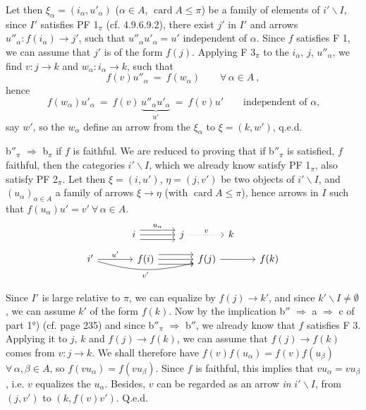 \documentclass[11pt]{article}
\newcommand{\printedpage}[1]{\marginpar{\footnotesize p.~#1}}
\newcommand{\msp}[1]{\marginpar{\footnotesize [#1]}}
\newcommand{\card}{\operatorname{card}}
\begin{document}
\msp{page 241}
Let then $\xi_\alpha = (i_\alpha, u'_\alpha)$ ($\alpha \in A$, $\card A \leqslant \pi$) be a family of elements of $i'\backslash I$, since $I'$ satisfies PF 1$_\pi$ (cf. 4.9.6.9.2), there exist $j'$ in $I'$ and arrows $u''_\alpha : f(i_\alpha) \longrightarrow j'$, such that $u''_\alpha u'_\alpha = u'$ independent of $\alpha$. Since $f$ satisfies F 1, we can assume that $j'$ is of the form $f(j)$. Applying F 3$_\pi$ to the $i_\alpha$, $j$, $u''_\alpha$, we find $v : j \longrightarrow k$ and $w_\alpha : i_\alpha \longrightarrow k$, such that
\[
f(v)u''_\alpha \ = \ f(w_\alpha) \qquad \forall\, \alpha \in A \ ,
\]
hence
\[
f(w_\alpha)u'_\alpha \ = \ f(v)\,\underbrace{u''_\alpha u'_\alpha}_{u'} \ = \ f(v)u' \qquad \text{independent of $\alpha$,}
\]
say $w'$, so the $w_\alpha$ define an arrow from the $\xi_\alpha$ to $\xi = (k, w')$, q.e.d.

b$''_\pi$ $\Longrightarrow$ b$_\pi$ if $f$ is faithful. We are reduced to proving that if b$''_\pi$ is satisfied, $f$ faithful, then the categories $i'\backslash I$, which we already know satisfy PF 1$_\pi$, also satisfy PF 2$_\pi$. Let then $\xi = (i, u')$, $\eta = (j, v')$ be two objects of $i'\backslash I$, and $(u_\alpha)_{\alpha\in A}$ a family of arrows $\xi \longrightarrow \eta$ (with $\card A \leqslant \pi$), hence arrows in $I$ such that $f(u_\alpha)u' = v' \ \forall\, \alpha \in A$.
\[
\begin{tikzcd}[column sep=large]
i \arrow[r, shift left=2, "u_\alpha"] \arrow[r] \arrow[r, shift right=2] & j \arrow[r, dotted, "v"] & k
\end{tikzcd}
\]
\[
\begin{tikzcd}[column sep=large]
i' \arrow[r, "u'"] \arrow[rr, bend right=15, "v'"'] & f(i) \arrow[r, shift left=2] \arrow[r] \arrow[r, shift right=2] & f(j) \arrow[r] & f(k)
\end{tikzcd}
\]

Since $I'$ is large relative to $\pi$, we can equalize by $f(j) \longrightarrow k'$, and since $k'\backslash I \neq \emptyset$, we can assume $k'$ of the form $f(k)$. Now
\msp{page 242}
by the implication b$''$ $\Longrightarrow$ a $\Longrightarrow$ c of part 1°) (cf. page 235) and since b$''_\pi$ $\Longrightarrow$ b$''$, we already know that $f$ satisfies F 3. Applying it to $j$, $k$ and $f(j) \longrightarrow f(k)$, we can
\printedpage{91}
assume that $f(j) \longrightarrow f(k)$ comes from $v : j \longrightarrow k$. We shall therefore have $f(v)f(u_\alpha) = f(v)f(u_\beta)$ $\forall\, \alpha, \beta \in A$, so $f(vu_\alpha) = f(vu_\beta)$. Since $f$ is faithful, this implies that $vu_\alpha = vu_\beta$, i.e. $v$ equalizes the $u_\alpha$. Besides, $v$ can be regarded as an arrow \textit{in} $i'\backslash I$, from $(j, v')$ to $(k, f(v)v')$. Q.e.d.
\end{document}
